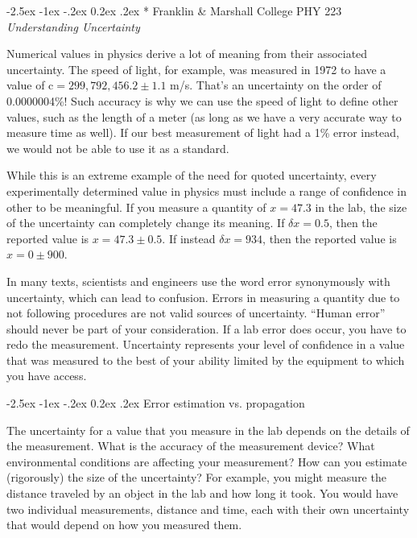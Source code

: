 \documentclass[11pt]{article}
\makeatletter
\renewcommand\section{\@startsection {section}{1}{\z@}%
     {-2.5ex \@plus -1ex \@minus -.2ex}%
     {0.2ex \@plus.2ex}%
    {\bfseries\Large}}
\makeatother
\begin{document}
\begin{center}
\section*{
Franklin \& Marshall College \hfill PHY 223\\
\bigskip
{\Large \it Understanding Uncertainty}}
\end{center}

Numerical values in physics derive a lot of meaning from their associated
uncertainty. The speed of light, for example, was measured in 1972 to have a value of $\textrm{c} =
299,792,456.2 \pm 1.1$ m/s. That's an uncertainty on the order of 0.0000004\%!
Such accuracy is why we can use the speed of light to define other values, such
as the length of a meter (as long as we have a very accurate way to measure time as
well). If our best measurement of light had a 1\% error instead, we would not be
able to use it as a standard.

While this is an extreme example of the need for quoted uncertainty, every
experimentally determined value in physics must include a range of confidence in
other to be meaningful. If you measure a quantity of $x=47.3$ in the lab, the size
of the uncertainty can completely change its meaning. If $\delta x = 0.5$, then
the reported value is $x = 47.3 \pm 0.5$. If instead $\delta x = 934$, then the
reported value is $x = 0 \pm 900$. 

In many texts, scientists and engineers use the word error synonymously with
uncertainty, which can lead to confusion. Errors in measuring a quantity due to
not following procedures are not valid sources of uncertainty. ``Human error''
should never be part of your consideration. If a lab error does occur, you have
to redo the measurement. Uncertainty represents your level of confidence in a
value that was measured to the best of your ability limited by the equipment to 
which you have access.

\section{Error estimation vs. propagation}

The uncertainty for a value that you measure in the lab depends on the details
of the measurement. What is the accuracy of the measurement device? What 
environmental conditions are affecting your measurement? How can you
estimate (rigorously) the size of the uncertainty? For example, you might measure
the distance traveled by an object in the lab and how long it took. You would
have two individual measurements, distance and time, each with their own
uncertainty that would depend on how you measured them.
\end{document}
